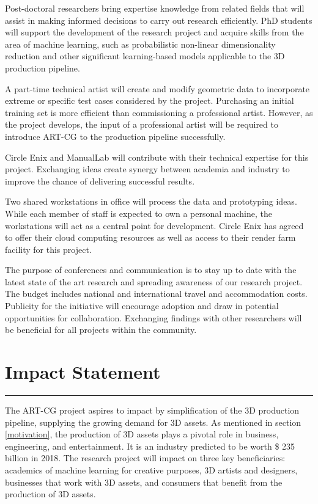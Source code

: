 \documentclass[a4paper, 11pt, onecolumn]{article} %
\numberwithin{equation}{section} %
\numberwithin{figure}{section} %
\numberwithin{table}{section} %
\begin{document}
Post-doctoral researchers bring expertise knowledge from related fields that will assist in making informed decisions to carry out research efficiently. PhD students will support the development of the research project and acquire skills from the area of machine learning, such as probabilistic non-linear dimensionality reduction and other significant learning-based models applicable to the 3D production pipeline.

A part-time technical artist will create and modify geometric data to incorporate extreme or specific test cases considered by the project. Purchasing an initial training set is more efficient than commissioning a professional artist. However, as the project develops, the input of a professional artist will be required to introduce ART-CG to the production pipeline successfully.

Circle Enix and ManualLab will contribute with their technical expertise for this project. Exchanging ideas create synergy between academia and industry to improve the chance of delivering successful results.

Two shared workstations in office will process the data and prototyping ideas. While each member of staff is expected to own a personal machine, the workstations will act as a central point for development. Circle Enix has agreed to offer their cloud computing resources as well as access to their render farm facility for this project.

The purpose of conferences and communication is to stay up to date with the latest state of the art research and spreading awareness of our research project. The budget includes national and international travel and accommodation costs. Publicity for the initiative will encourage adoption and draw in potential opportunities for collaboration. Exchanging findings with other researchers will be beneficial for all projects within the community.

\newpage

\section*{Impact Statement}
\hrule\vspace{0.5em}

The ART-CG project aspires to impact by simplification of the 3D production pipeline, supplying the growing demand for 3D assets. As mentioned in section \ref{motivation}, the production of 3D assets plays a pivotal role in business, engineering, and entertainment. It is an industry predicted to be worth \$ 235 billion in 2018. The research project will impact on three key beneficiaries: academics of machine learning for creative purposes, 3D artists and designers, businesses that work with 3D assets, and consumers that benefit from the production of 3D assets.
\end{document}

